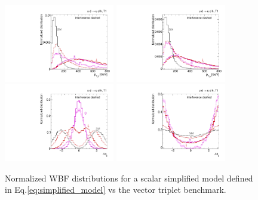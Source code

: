 \begin{figure}[t]
  \includegraphics[width=0.43\textwidth]{fig/validity/WBF_simplified_j1pt.pdf}
  \hspace*{0.05\textwidth}
  \includegraphics[width=0.43\textwidth]{fig/validity/WBF_simplified_Hpt.pdf} \\
  \includegraphics[width=0.43\textwidth]{fig/validity/WBF_simplified_deltaEtaJJ.pdf}
  \hspace*{0.05\textwidth}
  \includegraphics[width=0.43\textwidth]{fig/validity/WBF_simplified_deltaPhiJJ.pdf}
  \caption{Normalized WBF distributions for a scalar simplified model
    defined in Eq.\;\eqref{eq:simplified_model} vs the vector triplet
    benchmark.}
  \label{fig:validity_simplified}
\end{figure}

